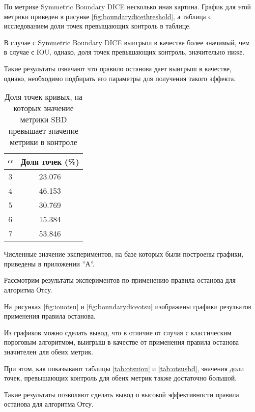 По метрике Symmetric Boundary DICE несколько иная картина. График для этой метрики приведен в рисунке \ref*{fig:boundarydicethreshold}, а таблица с исследованием доли точек превыщающих контроль в таблице.


В случае с Symmetric Boundary DICE выигрыш в качестве более значимый, чем в случае с IOU, однако, доля точек превышающих контроль, значительно ниже.

Такие результаты означают что правило останова дает выигрыш в качестве, однако, необходимо подбирать его параметры для получения такого эффекта.

\begin{table}[H]
\centering
\caption{Доля точек кривых, на которых значение метрики SBD превышает значение метрики в  контроле}
\label{tab:thresholdingsbd}
\begin{tabular}{|c|c|}
\hline
\(\alpha\) & Доля точек (\%) \\
\hline
3 & 23.076 \\
4 & 46.153 \\
5 & 30.769 \\
6 & 15.384 \\
7 & 53.846 \\
\hline
\end{tabular}
\end{table}

Численные значение экспериментов, на базе которых были построены графики, приведены в приложении ''А''.

Рассмотрим результаты экспериментов по применению правила останова для алгоритма Отсу. 

На рисунках \ref*{fig:iouotsu} и \ref*{fig:boundarydiceotsu} изображены графики резульатов применения правила останова. 

Из графиков можно сделать вывод, что в отличие от случая с классическим пороговым алгоритмом, выигрыш в качестве от применения правила останова значителен для обеих метрик. 

При этом, как показывают таблицы \ref*{tab:otsuiou} и \ref*{tab:otsusbd}, значения доли точек, превышающих контроль для обеих метрик также достаточно большой.
 
Такие результаты позволяют сделать вывод о высокой эффективности правила останова для алгоритма Отсу.

